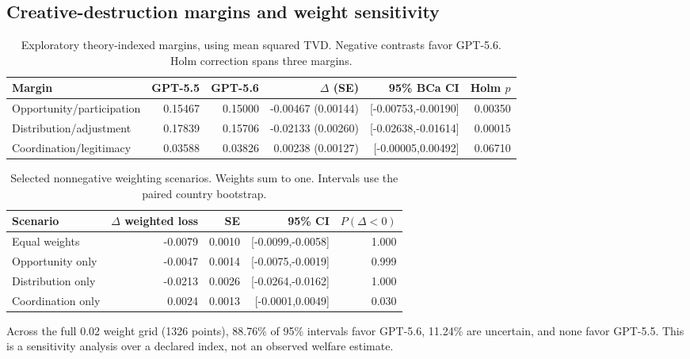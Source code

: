 \subsection{Creative-destruction margins and weight sensitivity}
\begin{table}[!htbp]\centering\small
\caption{Exploratory theory-indexed margins, using mean squared TVD. Negative contrasts favor GPT-5.6. Holm correction spans three margins.}\label{tab:economic-margins}
\begin{tabular}{lrrrrr}\toprule
\rowcolor{tablehead} Margin & GPT-5.5 & GPT-5.6 & $\Delta$ (SE) & 95\% BCa CI & Holm $p$ \\\midrule
\rowcolor{improvebg}
Opportunity/participation & 0.15467 & 0.15000 & -0.00467 (0.00144) & [-0.00753,-0.00190] & 0.00350 \\
\rowcolor{improvebg}
Distribution/adjustment & 0.17839 & 0.15706 & -0.02133 (0.00260) & [-0.02638,-0.01614] & 0.00015 \\
Coordination/legitimacy & 0.03588 & 0.03826 & 0.00238 (0.00127) & [-0.00005,0.00492] & 0.06710 \\
\bottomrule\end{tabular}\end{table}
\begin{table}[!htbp]\centering\small
\caption{Selected nonnegative weighting scenarios. Weights sum to one. Intervals use the paired country bootstrap.}\label{tab:economic-scenarios}
\begin{tabular}{lrrrr}\toprule
\rowcolor{tablehead} Scenario & $\Delta$ weighted loss & SE & 95\% CI & $P(\Delta<0)$ \\\midrule
\rowcolor{improvebg}
Equal weights & -0.0079 & 0.0010 & [-0.0099,-0.0058] & 1.000 \\
\rowcolor{improvebg}
Opportunity only & -0.0047 & 0.0014 & [-0.0075,-0.0019] & 0.999 \\
\rowcolor{improvebg}
Distribution only & -0.0213 & 0.0026 & [-0.0264,-0.0162] & 1.000 \\
Coordination only & 0.0024 & 0.0013 & [-0.0001,0.0049] & 0.030 \\
\bottomrule\end{tabular}\end{table}
Across the full 0.02 weight grid (1326 points), 88.76\% of 95\% intervals favor GPT-5.6, 11.24\% are uncertain, and none favor GPT-5.5. This is a sensitivity analysis over a declared index, not an observed welfare estimate.
